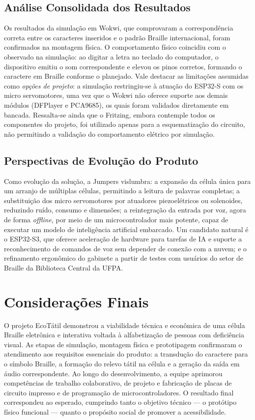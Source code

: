 \documentclass[12pt, a4paper]{article}
\begin{document}
\subsection{Análise Consolidada dos Resultados}
Os resultados da simulação em Wokwi, que comprovaram a correspondência correta entre os caracteres inseridos e o padrão Braille internacional, foram confirmados na montagem física. O comportamento físico coincidiu com o observado na simulação: ao digitar a letra no teclado do computador, o dispositivo emitiu o som correspondente e elevou os pinos corretos, formando o caractere em Braille conforme o planejado.
Vale destacar as limitações assumidas como \textit{opções de projeto}: a simulação restringiu-se à atuação do ESP32-S com os micro servomotores, uma vez que o Wokwi não oferece suporte aos demais módulos (DFPlayer e PCA9685), os quais foram validados diretamente em bancada. Ressalta-se ainda que o Fritzing, embora contemple todos os componentes do projeto, foi utilizado apenas para a esquematização do circuito, não permitindo a validação do comportamento elétrico por simulação.

\subsection{Perspectivas de Evolução do Produto}
Como evolução da solução, a Jumpers vislumbra: a expansão da célula única para um arranjo de múltiplas células, permitindo a leitura de palavras completas; a substituição dos micro servomotores por atuadores piezoelétricos ou solenoides, reduzindo ruído, consumo e dimensões; a reintegração da entrada por voz, agora de forma \textit{offline}, por meio de um microcontrolador mais potente, capaz de executar um modelo de inteligência artificial embarcado. Um candidato natural é o ESP32-S3, que oferece aceleração de hardware para tarefas de IA e suporte a reconhecimento de comandos de voz sem depender de conexão com a nuvem; e o refinamento ergonômico do gabinete a partir de testes com usuários do setor de Braille da Biblioteca Central da UFPA.

\newpage
\section{Considerações Finais}
O projeto EcoTátil demonstrou a viabilidade técnica e econômica de uma célula Braille eletrônica e interativa voltada à alfabetização de pessoas com deficiência visual. As etapas de simulação, montagem física e prototipagem confirmaram o atendimento aos requisitos essenciais do produto: a transdução do caractere para o símbolo Braille, a formação do relevo tátil na célula e a geração da saída em áudio correspondente. Ao longo do desenvolvimento, a equipe aprimorou competências de trabalho colaborativo, de projeto e fabricação de placas de circuito impresso e de programação de microcontroladores. O resultado final correspondeu ao esperado, cumprindo tanto o objetivo técnico --- o protótipo físico funcional --- quanto o propósito social de promover a acessibilidade.
\end{document}
